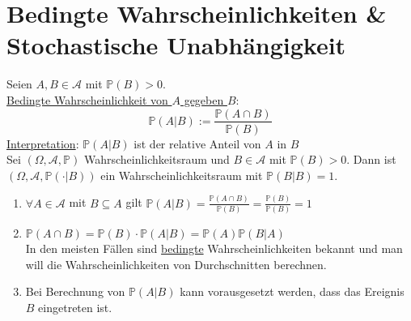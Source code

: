 \documentclass[a4paper]{article}
\newcommand{\ul}{\underline}
\begin{document}
\section{Bedingte Wahrscheinlichkeiten \& Stochastische Unabhängigkeit}
Seien $A,B\in\mathcal{A}$ mit $\mathbb{P}(B)>0$.\\
\ul{Bedingte Wahrscheinlichkeit von $A$ gegeben $B$}: $$\mathbb{P}(A\vert B):=\frac{\mathbb{P}(A\cap B)}{\mathbb{P}(B)}$$
\ul{Interpretation}: $\mathbb{P}(A\vert B)$ ist der relative Anteil von $A$ in $B$\\
Sei $(\Omega,\mathcal{A},\mathbb{P})$ Wahrscheinlichkeitsraum und $B\in\mathcal{A}$ mit $\mathbb{P}(B)>0$. Dann ist $(\Omega,\mathcal{A},\mathbb{P}(\cdot\vert B))$ ein Wahrscheinlichkeitsraum mit $\mathbb{P}(B\vert B)=1$.\\
\begin{enumerate}[1)]
	\item $\forall A\in\mathcal{A}$ mit $B\subseteq A$ gilt $\mathbb{P}(A\vert B)=\frac{\mathbb{P}(A\cap B)}{\mathbb{P}(B)}=\frac{\mathbb{P}(B)}{\mathbb{P}(B)}=1$
	\item $\mathbb{P}(A\cap B)=\mathbb{P}(B)\cdot\mathbb{P}(A\vert B)=\mathbb{P}(A)\mathbb{P}(B\vert A)$\\
	In den meisten Fällen sind \ul{bedingte} Wahrscheinlichkeiten bekannt und man will die Wahrscheinlichkeiten von Durchschnitten berechnen.
	\item Bei Berechnung von $\mathbb{P}(A\vert B)$ kann vorausgesetzt werden, dass das Ereignis $B$ eingetreten ist.
\end{enumerate}
\end{document}
